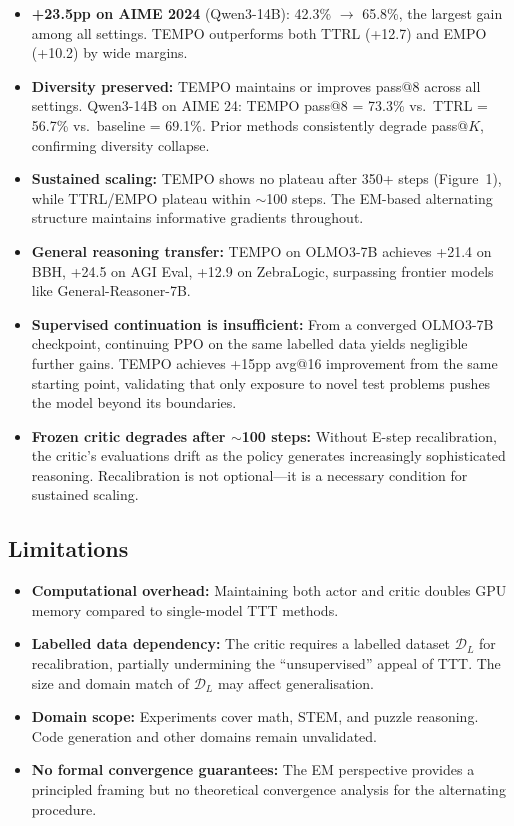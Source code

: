 \documentclass[11pt]{article}
\begin{document}
\begin{itemize}
    \item \textbf{+23.5pp on AIME 2024} (Qwen3-14B): 42.3\% $\to$ 65.8\%, the largest gain among all settings. TEMPO outperforms both TTRL (+12.7) and EMPO (+10.2) by wide margins.

    \item \textbf{Diversity preserved:} TEMPO maintains or improves pass@8 across all settings. Qwen3-14B on AIME 24: TEMPO pass@8 = 73.3\% vs.\ TTRL = 56.7\% vs.\ baseline = 69.1\%. Prior methods consistently degrade pass@$K$, confirming diversity collapse.

    \item \textbf{Sustained scaling:} TEMPO shows no plateau after 350+ steps (Figure~1), while TTRL/EMPO plateau within $\sim$100 steps. The EM-based alternating structure maintains informative gradients throughout.

    \item \textbf{General reasoning transfer:} TEMPO on OLMO3-7B achieves +21.4 on BBH, +24.5 on AGI Eval, +12.9 on ZebraLogic, surpassing frontier models like General-Reasoner-7B.

    \item \textbf{Supervised continuation is insufficient:} From a converged OLMO3-7B checkpoint, continuing PPO on the same labelled data yields negligible further gains. TEMPO achieves +15pp avg@16 improvement from the same starting point, validating that only exposure to novel test problems pushes the model beyond its boundaries.

    \item \textbf{Frozen critic degrades after $\sim$100 steps:} Without E-step recalibration, the critic's evaluations drift as the policy generates increasingly sophisticated reasoning. Recalibration is not optional---it is a necessary condition for sustained scaling.
\end{itemize}

\subsection{Limitations}

\begin{itemize}
    \item \textbf{Computational overhead:} Maintaining both actor and critic doubles GPU memory compared to single-model TTT methods.

    \item \textbf{Labelled data dependency:} The critic requires a labelled dataset $\mathcal{D}_L$ for recalibration, partially undermining the ``unsupervised'' appeal of TTT. The size and domain match of $\mathcal{D}_L$ may affect generalisation.

    \item \textbf{Domain scope:} Experiments cover math, STEM, and puzzle reasoning. Code generation and other domains remain unvalidated.

    \item \textbf{No formal convergence guarantees:} The EM perspective provides a principled framing but no theoretical convergence analysis for the alternating procedure.
\end{itemize}
\end{document}
